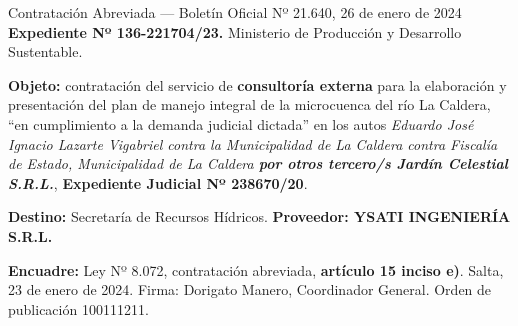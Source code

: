 \begin{ficha}{Contratación Abreviada --- Boletín Oficial Nº 21.640, 26 de enero de 2024}
\textbf{Expediente Nº 136-221704/23.} Ministerio de Producción y Desarrollo Sustentable.

\textbf{Objeto:} contratación del servicio de \textbf{consultoría externa} para la elaboración y presentación del plan de manejo integral de la microcuenca del río La Caldera, ``en cumplimiento a la demanda judicial dictada'' en los autos \textit{Eduardo José Ignacio Lazarte Vigabriel contra la Municipalidad de La Caldera contra Fiscalía de Estado, Municipalidad de La Caldera \textbf{por otros tercero/s Jardín Celestial S.R.L.}}, \textbf{Expediente Judicial Nº 238670/20}.

\textbf{Destino:} Secretaría de Recursos Hídricos. \textbf{Proveedor: YSATI INGENIERÍA S.R.L.}

\textbf{Encuadre:} Ley Nº 8.072, contratación abreviada, \textbf{artículo 15 inciso e)}. Salta, 23 de enero de 2024. Firma: Dorigato Manero, Coordinador General. Orden de publicación 100111211.
\end{ficha}

